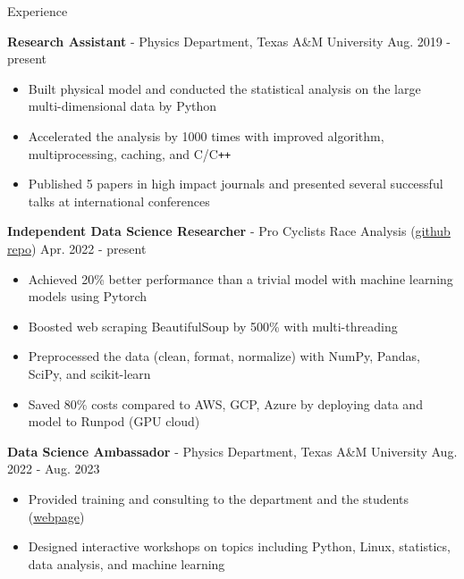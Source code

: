 \documentclass{resume}
\begin{document}
\vspace{-0.5em}
\begin{rSection}{Experience}
    \vspace{-1em}
    \item \textbf{Research Assistant} - Physics Department, Texas A\&M University \hfill Aug. 2019 - present
        \begin{itemize}
        \item Built physical model and conducted the statistical analysis on the large multi-dimensional data by Python
        \item Accelerated the analysis by 1000 times with improved algorithm, multiprocessing, caching, and C/C\texttt{++}
        \item Published 5 papers in high impact journals and presented several successful talks at international conferences
        \end{itemize}

    \item \textbf{Independent Data Science Researcher} - {Pro Cyclists Race Analysis} (\href{https://github.com/noctildon/pro_cyclists}{github repo}) \hfill Apr. 2022 - present
        \begin{itemize}
        \item Achieved 20\% better performance than a trivial model with machine learning models using Pytorch
        \item Boosted web scraping BeautifulSoup by 500\% with multi-threading
        \item Preprocessed the data (clean, format, normalize) with NumPy, Pandas, SciPy, and scikit-learn
        \item Saved 80\% costs compared to AWS, GCP, Azure by deploying data and model to Runpod (GPU cloud)
        \end{itemize}

    \item \textbf{Data Science Ambassador} - Physics Department, Texas A\&M University \hfill Aug. 2022 - Aug. 2023
        \begin{itemize}
        \item Provided training and consulting to the department and the students (\href{https://noctildon.github.io/DS_ambassador/index.html}{webpage})
        \item Designed interactive workshops on topics including Python, Linux, statistics, data analysis, and machine learning
        \end{itemize}


\end{rSection}
\end{document}
